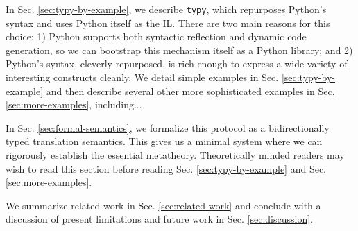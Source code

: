 \documentclass[preprint,10pt]{sigplanconf}
\newcommand{\typy}{\texttt{typy}}
\begin{document}
In Sec. \ref{sec:typy-by-example}, we describe  \texttt{typy}, which repurposes  Python's syntax and uses Python itself as the IL. There are two main reasons for this choice: 1) Python supports both syntactic reflection and dynamic code generation, so we can bootstrap this mechanism itself as a Python library; and 2) Python's syntax, cleverly repurposed, is rich enough to express a wide variety of interesting constructs cleanly. We detail simple examples in Sec. \ref{sec:typy-by-example} and then describe several other more sophisticated examples in Sec. \ref{sec:more-examples}, including...%

In Sec. \ref{sec:formal-semantics}, we formalize this protocol as a  bidirectionally typed translation semantics. This gives us a minimal system where we can rigorously establish the essential metatheory. Theoretically minded readers may wish to read this section before reading Sec. \ref{sec:typy-by-example} and Sec. \ref{sec:more-examples}.

We summarize related work in Sec. \ref{sec:related-work}  and conclude with a discussion of present limitations and future work in Sec. \ref{sec:discussion}.


\end{document}

